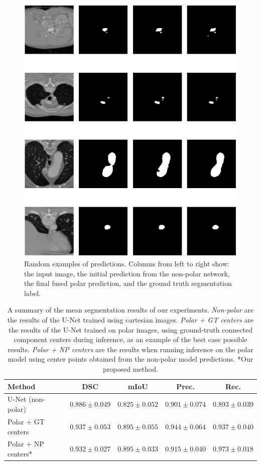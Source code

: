 \begin{figure}[b!]
\centering
\includegraphics[width=\columnwidth]{images/4/examples_3}
\caption{Random examples of predictions. Columns from left to right show: the input image, the initial prediction from the non-polar network, the final fused polar prediction, and the ground truth segmentation label. \cite{bencevicUsingPolarTransform2022a}}
\label{fig:examples}
\end{figure}

\begin{table}[b!]
\def\arraystretch{1.2}
\centering
\begin{tabularx}{\linewidth}{X c c c c} 
 \textbf{Method} & \textbf{DSC} & \textbf{mIoU} & \textbf{Prec.} & \textbf{Rec.} \\ 
 \hline
U-Net (non-polar) & $0.886 \pm 0.049$ & $0.825 \pm 0.052$ & $0.901 \pm 0.074$ & $0.893 \pm 0.039$ \\
Polar + GT centers & $0.937 \pm 0.053$ & $0.895 \pm 0.055$ & $0.944 \pm 0.064$ & $0.937 \pm 0.040$ \\
Polar + NP centers* & $0.932 \pm 0.027$ & $0.895 \pm 0.033$ & $0.915 \pm 0.040$ & $0.973 \pm 0.018$ \\
\end{tabularx}
\caption{A summary of the mean segmentation results of our experiments. \textit{Non-polar} are the results of the U-Net trained using cartesian images. \textit{Polar + GT centers} are the results of the U-Net trained on polar images, using ground-truth connected component centers during inference, as an example of the best case possible results. \textit{Polar + NP centers} are the results when running inference on the polar model using center points obtained from the non-polar model predictions. *Our proposed method.}
\label{table:results}
\end{table}

